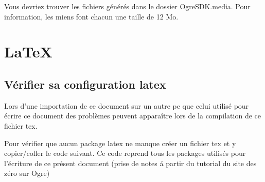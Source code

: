 \documentclass[10pt,a4paper]{report}
\begin{document}
Vous devriez trouver les fichiers g\'en\'er\'es dans le dossier OgreSDK.media. Pour information, les miens font chacun une taille de 12 Mo.









































\appendix
\chapter{LaTeX}

\section{V\'erifier sa configuration latex}
Lors d'une importation de ce document sur un autre pc que celui utilis\'e pour \'ecrire ce document des probl\`emes peuvent appara\^itre lors de la compilation de ce fichier tex.\newline

Pour v\'erifier que aucun package latex ne manque cr\'eer un fichier tex et y copier/coller le code suivant. Ce code reprend tous les packages utilis\'es pour l'\'ecriture de ce pr\'esent document (prise de notes \'a partir du tutorial du site des z\'ero sur Ogre)
\end{document}
